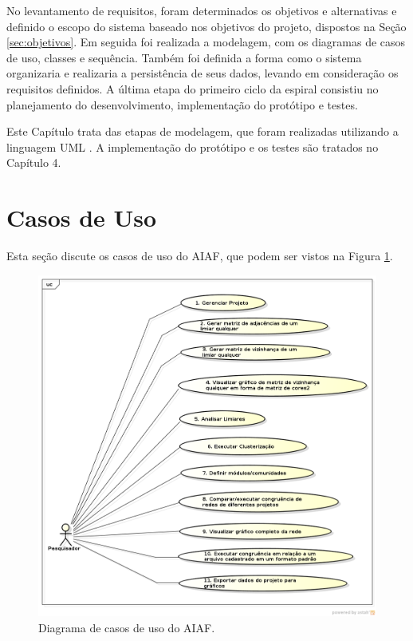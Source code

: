 No levantamento de requisitos, foram determinados os objetivos e alternativas e definido o escopo do sistema baseado nos objetivos do projeto,
dispostos na Seção \ref{sec:objetivos}. Em seguida foi realizada a modelagem, com os diagramas de casos de uso, classes e sequência.
Também foi definida a forma como o sistema organizaria e realizaria a persistência de seus dados, levando em consideração os requisitos definidos.
A última etapa do primeiro ciclo da espiral consistiu no planejamento do desenvolvimento, implementação do protótipo e testes.

Este Capítulo trata das etapas de modelagem, que foram realizadas utilizando a linguagem UML \cite{uml}. A implementação do protótipo e os testes são
tratados no Capítulo 4.

\section{Casos de Uso} \label{sec:escopo}

Esta seção discute os casos de uso do AIAF, que podem ser vistos na Figura \ref{fig:casos-uso}.

\begin{figure}
\centering
\includegraphics[scale=0.52]{diagrama-casos-de-uso}
\caption{Diagrama de casos de uso do AIAF.}
\label{fig:casos-uso}
\end{figure}

